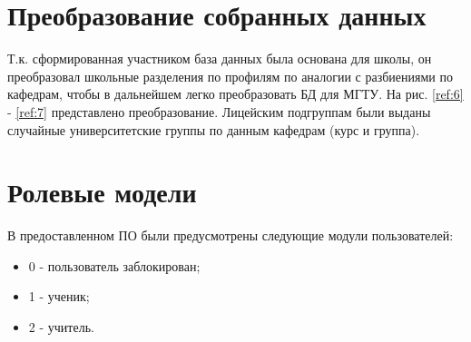 \documentclass[12pt]{report}
\begin{document}
\section{Преобразование собранных данных}

Т.к. сформированная участником база данных была основана для школы, он 
преобразовал школьные разделения по профилям по аналогии с разбиениями по кафедрам,
чтобы в дальнейшем легко преобразовать БД для МГТУ. На рис.  \ref{ref:6} - \ref{ref:7} представлено преобразование.  
Лицейским подгруппам были выданы случайные университетские группы
по данным кафедрам (курс и группа).

\begin{figure}[ht!]	
\end{figure}

\begin{figure}[ht!]	
\end{figure}

\section{Ролевые модели}

В предоставленном ПО были предусмотрены следующие модули пользователей:


\begin{itemize}
	\item 0 - пользователь заблокирован;
	\item 1 - ученик;
	\item 2 - учитель.
\end{itemize}
\end{document}
